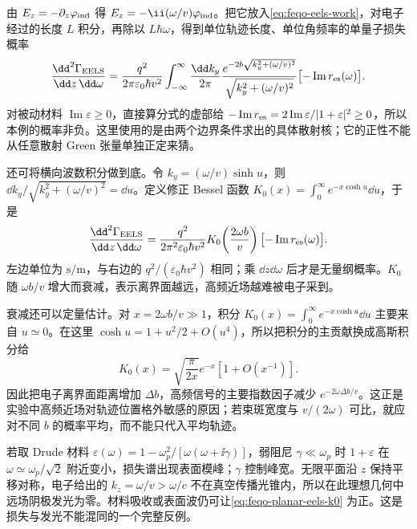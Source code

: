 由 \(E_z=-\partial_z\varphi_{\rm ind}\) 得 \(E_z=-\ii(\omega/v)\varphi_{\rm ind}\)。把它放入\cref{eq:feqo-eels-work}，对电子经过的长度 \(L\) 积分，再除以 \(L\hbar\omega\)，得到单位轨迹长度、单位角频率的单量子损失概率
\begin{equation}
\frac{\dd^2\Gamma_{\rm EELS}}{\dd z\,\dd\omega}
=\frac{q^2}{2\pi\varepsilon_0\hbar v^2}
\int_{-\infty}^{\infty}\frac{\dd k_y}{2\pi}
\frac{e^{-2b\sqrt{k_y^2+(\omega/v)^2}}}{\sqrt{k_y^2+(\omega/v)^2}}
\bigl[-\operatorname{Im}r_{\rm es}(\omega)\bigr].
\label{eq:feqo-planar-eels}
\end{equation}
对被动材料 \(\operatorname{Im}\varepsilon\geq0\)，直接算分式的虚部给 \(-\operatorname{Im}r_{\rm es}=2\operatorname{Im}\varepsilon/|1+\varepsilon|^2\geq0\)，所以本例的概率非负。这里使用的是由两个边界条件求出的具体散射核；它的正性不能从任意散射 Green 张量单独正定来猜。

还可将横向波数积分做到底。令 \(k_y=(\omega/v)\sinh u\)，则 \(\dd k_y/\sqrt{k_y^2+(\omega/v)^2}=\dd u\)。定义修正 Bessel 函数 \(K_0(x)=\int_0^\infty e^{-x\cosh u}\dd u\)，于是
\begin{equation}
\frac{\dd^2\Gamma_{\rm EELS}}{\dd z\,\dd\omega}
=\frac{q^2}{2\pi^2\varepsilon_0\hbar v^2}
K_0\!\left(\frac{2\omega b}{v}\right)
\bigl[-\operatorname{Im}r_{\rm es}(\omega)\bigr].
\label{eq:feqo-planar-eels-k0}
\end{equation}
左边单位为 \(\si{\second\per\metre}\)，与右边的 \(q^2/(\varepsilon_0\hbar v^2)\) 相同；乘 \(\dd z\dd\omega\) 后才是无量纲概率。\(K_0\) 随 \(\omega b/v\) 增大而衰减，表示离界面越远，高频近场越难被电子采到。

衰减还可以定量估计。对 \(x=2\omega b/v\gg1\)，积分 \(K_0(x)=\int_0^\infty e^{-x\cosh u}\dd u\) 主要来自 \(u\simeq0\)。在这里 \(\cosh u=1+u^2/2+O(u^4)\)，所以把积分的主贡献换成高斯积分给
\[
K_0(x)=\sqrt{\frac{\pi}{2x}}e^{-x}
\left[1+O(x^{-1})\right].
\]
因此把电子离界面距离增加 \(\Delta b\)，高频信号的主要指数因子减少 \(e^{-2\omega\Delta b/v}\)。这正是实验中高频近场对轨迹位置格外敏感的原因；若束斑宽度与 \(v/(2\omega)\) 可比，就应对不同 \(b\) 的概率平均，而不能只代入平均轨迹。

若取 Drude 材料 \(\varepsilon(\omega)=1-\omega_p^2/[\omega(\omega+\ii\gamma)]\)，弱阻尼 \(\gamma\ll\omega_p\) 时 \(1+\varepsilon\) 在 \(\omega\simeq\omega_p/\sqrt2\) 附近变小，损失谱出现表面模峰；\(\gamma\) 控制峰宽。无限平面沿 \(z\) 保持平移对称，电子给出的 \(k_z=\omega/v>\omega/c\) 不在真空传播光锥内，所以在此理想几何中远场阴极发光为零。材料吸收或表面波仍可让\cref{eq:feqo-planar-eels-k0} 为正。这是损失与发光不能混同的一个完整反例。

